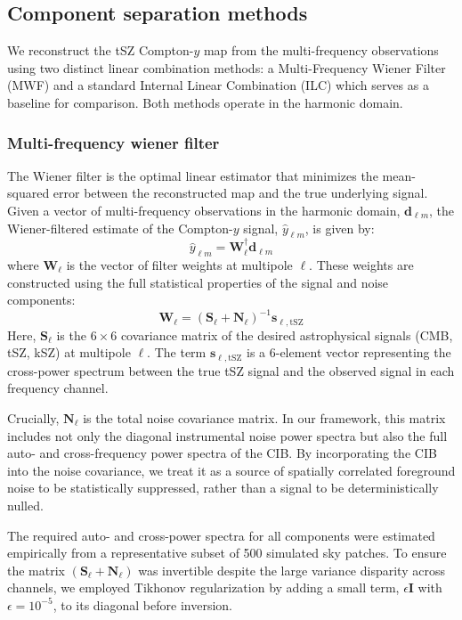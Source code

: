 \documentclass[]{article}
\begin{document}
\subsection{Component separation methods}
We reconstruct the tSZ Compton-$y$ map from the multi-frequency observations using two distinct linear combination methods: a Multi-Frequency Wiener Filter (MWF) and a standard Internal Linear Combination (ILC) which serves as a baseline for comparison. Both methods operate in the harmonic domain.

\subsubsection{Multi-frequency wiener filter}
The Wiener filter is the optimal linear estimator that minimizes the mean-squared error between the reconstructed map and the true underlying signal. Given a vector of multi-frequency observations in the harmonic domain, $\mathbf{d}_{\ell m}$, the Wiener-filtered estimate of the Compton-$y$ signal, $\hat{y}_{\ell m}$, is given by:
\begin{equation}
    \hat{y}_{\ell m} = \mathbf{W}_{\ell}^{\dagger} \mathbf{d}_{\ell m}
\end{equation}
where $\mathbf{W}_{\ell}$ is the vector of filter weights at multipole $\ell$. These weights are constructed using the full statistical properties of the signal and noise components:
\begin{equation}
    \mathbf{W}_{\ell} = \left( \mathbf{S}_{\ell} + \mathbf{N}_{\ell} \right)^{-1} \mathbf{s}_{\ell, \text{tSZ}}
\end{equation}
Here, $\mathbf{S}_{\ell}$ is the $6 \times 6$ covariance matrix of the desired astrophysical signals (CMB, tSZ, kSZ) at multipole $\ell$. The term $\mathbf{s}_{\ell, \text{tSZ}}$ is a 6-element vector representing the cross-power spectrum between the true tSZ signal and the observed signal in each frequency channel.

Crucially, $\mathbf{N}_{\ell}$ is the total noise covariance matrix. In our framework, this matrix includes not only the diagonal instrumental noise power spectra but also the full auto- and cross-frequency power spectra of the CIB. By incorporating the CIB into the noise covariance, we treat it as a source of spatially correlated foreground noise to be statistically suppressed, rather than a signal to be deterministically nulled.

The required auto- and cross-power spectra for all components were estimated empirically from a representative subset of 500 simulated sky patches. To ensure the matrix $(\mathbf{S}_{\ell} + \mathbf{N}_{\ell})$ was invertible despite the large variance disparity across channels, we employed Tikhonov regularization by adding a small term, $\epsilon \mathbf{I}$ with $\epsilon=10^{-5}$, to its diagonal before inversion.
\end{document}
